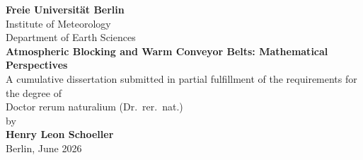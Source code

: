 
\newif\ifreviewersinbinding
\reviewersinbindingfalse  %

\begin{titlepage}
    \centering
    {\Large \textbf{Freie Universität Berlin}}\\[1.5cm]
    {\large Institute of Meteorology}\\[0.5cm]
    {\large Department of Earth Sciences}\\[2.0cm]
    {\huge \textbf{Atmospheric Blocking and Warm Conveyor Belts:
        Mathematical Perspectives}}\\[1.5cm]
    {\large A cumulative dissertation submitted in partial fulfillment of the
    requirements for the degree of}\\[0.5cm]
    {\Large Doctor rerum naturalium (Dr.~rer.~nat.)}\\[1.5cm]
    {\large by}\\[0.5cm]
    {\Large \textbf{Henry Leon Schoeller}}\\[2.0cm]
    \vfill
    {\large Berlin, June 2026}\\
\end{titlepage}
\cleardoublepage

\ifreviewersinbinding
